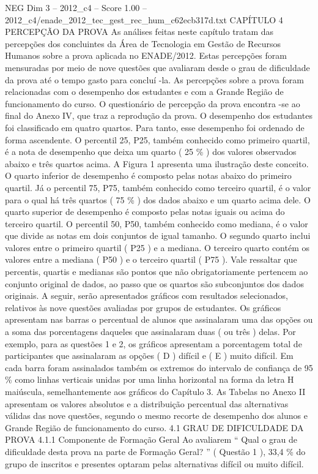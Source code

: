 \begin{textsample}{NEG Dim 3 – 2012\_c4 – Score 1.00 – 2012\_c4/enade\_2012\_tec\_gest\_rec\_hum\_c62ecb317d.txt}  \label{ex:f3_neg_128}
CAPÍTULO 4 PERCEPÇÃO DA PROVA As análises feitas neste capítulo tratam das percepções dos concluintes da Área de Tecnologia em Gestão de Recursos Humanos sobre a prova aplicada no ENADE/2012.
Estas percepções foram mensuradas por meio de nove questões que avaliaram desde o grau de dificuldade da prova até o tempo gasto para concluí -la.
As percepções sobre a prova foram relacionadas com o desempenho dos estudantes e com a Grande Região de funcionamento do curso.
O questionário de percepção da prova encontra -se ao final do Anexo IV, que traz a reprodução da prova.
O desempenho dos estudantes foi classificado em quatro quartos.
Para tanto, esse desempenho foi ordenado de forma ascendente.
O percentil 25, P25, também conhecido como primeiro quartil, é a nota de desempenho que deixa um quarto ( 25 \% ) dos valores observados abaixo e três quartos acima.
A Figura 1 apresenta uma ilustração deste conceito.
O quarto inferior de desempenho é composto pelas notas abaixo do primeiro quartil.
Já o percentil 75, P75, também conhecido como terceiro quartil, é o valor para o qual há três quartos ( 75 \% ) dos dados abaixo e um quarto acima dele.
O quarto superior de desempenho é composto pelas notas iguais ou acima do terceiro quartil.
O percentil 50, P50, também conhecido como mediana, é o valor que divide as notas em dois conjuntos de igual tamanho.
O segundo quarto inclui valores entre o primeiro quartil ( P25 ) e a mediana.
O terceiro quarto contém os valores entre a mediana ( P50 ) e o terceiro quartil ( P75 ).
Vale ressaltar que percentis, quartis e medianas são pontos que não obrigatoriamente pertencem ao conjunto original de dados, ao passo que os quartos são subconjuntos dos dados originais.
A seguir, serão apresentados gráficos com resultados selecionados, relativos às nove questões avaliadas por grupos de estudantes.
Os gráficos apresentam nas barras o percentual de alunos que assinalaram uma das opções ou a soma das porcentagens daqueles que assinalaram duas ( ou três ) delas.
Por exemplo, para as questões 1 e 2, os gráficos apresentam a porcentagem total de participantes que assinalaram as opções ( D ) difícil e ( E ) muito difícil.
Em cada barra foram assinalados também os extremos do intervalo de confiança de 95 \% como linhas verticais unidas por uma linha horizontal na forma da letra H maiúscula, semelhantemente aos gráficos do Capítulo 3.
As Tabelas no Anexo II apresentam os valores absolutos e a distribuição percentual das alternativas válidas das nove questões, segundo o mesmo recorte de desempenho dos alunos e Grande Região de funcionamento do curso. 4.1 GRAU DE DIFICULDADE DA PROVA 4.1.1 Componente de Formação Geral Ao avaliarem “ Qual o grau de dificuldade desta prova na parte de Formação Geral? ” ( Questão 1 ), 33,4 \% do grupo de inscritos e presentes optaram pelas alternativas difícil ou muito difícil.

\end{textsample}
